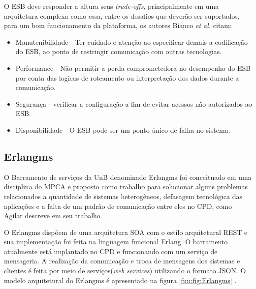 O \acrshort{ESB} deve responder a altura seus \textit{trade-offs},  principalmente em uma arquitetura complexa como essa, entre os desafios que deverão ser suportados, para um bom funcionamento da plataforma, os autores Bianco \textit{et al.} \cite{bianco2011architecting} citam:

\begin{itemize}

\item Manutenibilidade - Ter cuidado e atenção ao especificar demais a codificação do \acrshort{ESB}, ao ponto de restringir comunicação com outras tecnologias. 
 	
\item Performance - Não permitir a perda comprometedora no desempenho do \acrshort{ESB} por conta das logicas de roteamento ou interpretação dos dados durante a comunicação.

\item Segurança - verificar a configuração a fim de evitar acessos não autorizados ao \acrshort{ESB}.

\item Disponibilidade - O \acrshort{ESB} pode ser um ponto único de falha no sistema.

\end{itemize}


\subsection{Erlangms}
O Barramento de serviços da \acrshort{UnB} denominado Erlangms foi conceituado em uma disciplina do \acrshort{MPCA} e proposto como trabalho para solucionar alguns problemas relacionados a quantidade de sistemas heterogêneos, defasagem tecnológica das aplicações e a falta de um padrão de comunicação entre eles no \acrshort{CPD}, como Agilar \cite{Agilar} descreve em seu trabalho. 

O Erlangms dispõem de uma arquitetura \acrshort{SOA} com o estilo arquitetural \acrshort{REST} e sua implementação foi feita na linguagem funcional Erlang. O barramento atualmente está implantado no \acrshort{CPD} e  funcionando com um serviço de mensageria. A realização da comunicação e troca de mensagens dos sistemas e clientes é feita por meio de serviços(\textit{web services}) utilizando o formato \acrshort{JSON}. O modelo arquitetural do Erlangms é apresentado na figura \ref{fun:fig:Erlangms} .


